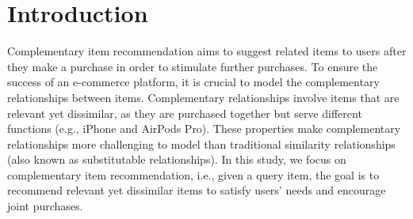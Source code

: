 \documentclass[letterpaper]{article} %
\newcommand{\suhang}[1]{\textcolor{blue}{SW: #1}}
\begin{document}
\begin{abstract}
 
\end{abstract}

\section{Introduction}
Complementary item recommendation \cite{liu2020decoupled, hao2020p, bibas2023semi} aims to suggest related items to users after they make a purchase in order to stimulate further purchases. To ensure the success of an e-commerce platform, it is crucial to model the complementary relationships between items. Complementary relationships involve items that are relevant yet dissimilar, as they are purchased together but serve different functions (e.g., iPhone and AirPods Pro). These properties make complementary relationships more challenging to model than traditional similarity relationships (also known as substitutable relationships). In this study, we focus on complementary item recommendation, i.e., given a query item, the goal is to recommend relevant yet dissimilar items to satisfy users' needs and encourage joint purchases.
\end{document}
